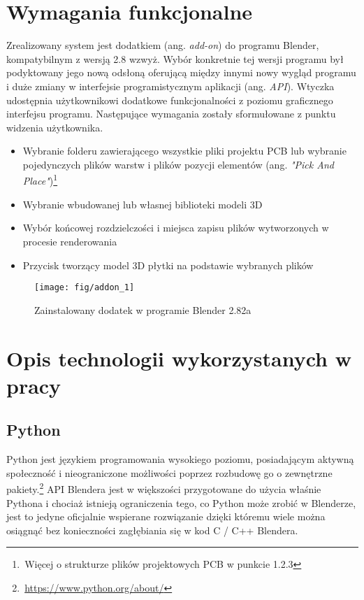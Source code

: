 \documentclass[brudnopis]{xmgr}
\begin{document}
\section{Wymagania funkcjonalne}

Zrealizowany system jest dodatkiem (ang. \emph{add-on}) do programu Blender, kompatybilnym z wersją 2.8 wzwyż. Wybór konkretnie tej wersji programu był podyktowany jego nową odsłoną oferującą między innymi nowy wygląd programu i duże zmiany w interfejsie programistycznym aplikacji (ang. \emph{API}). Wtyczka udostępnia użytkownikowi dodatkowe funkcjonalności z poziomu graficznego interfejsu programu. Następujące wymagania zostały sformułowane z punktu widzenia użytkownika.
\begin{itemize}
\item Wybranie folderu zawierającego wszystkie pliki projektu PCB lub wybranie pojedynczych plików warstw i  plików pozycji elementów (ang. \emph{"Pick And Place"})\footnote{\,Więcej o strukturze plików projektowych PCB w punkcie 1.2.3}
\item Wybranie wbudowanej lub własnej biblioteki modeli 3D
\item Wybór końcowej rozdzielczości i miejsca zapisu plików wytworzonych w procesie renderowania
\item Przycisk tworzący model 3D płytki na podstawie wybranych plików
\end{itemize}

\begin{figure}
\centering
\texttt{[image: fig/addon\_1]}
\caption{Zainstalowany dodatek w programie Blender 2.82a}
\end{figure}

\section {Opis technologii wykorzystanych w pracy}

\subsection{Python}
Python jest językiem programowania wysokiego poziomu, posiadającym aktywną społeczność i nieograniczone możliwości poprzez rozbudowę go o zewnętrzne pakiety.\footnote {\,\url{https://www.python.org/about/}} API Blendera jest w większości przygotowane do użycia właśnie Pythona i chociaż istnieją ograniczenia tego, co Python może zrobić w Blenderze, jest to jedyne oficjalnie wspierane rozwiązanie dzięki któremu wiele można osiągnąć bez konieczności zagłębiania się w kod C / C++ Blendera.
\end{document}

